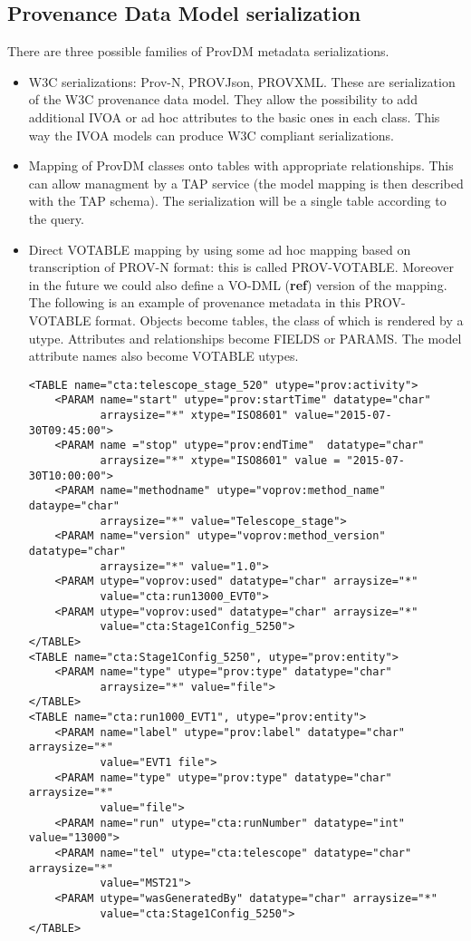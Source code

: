 \subsection{Provenance Data Model serialization}
There are three possible families of ProvDM metadata serializations.
\begin{itemize}
 \item W3C serializations: Prov-N, PROV\-Json, PROV\-XML. These are serialization of the W3C provenance data model. They allow the possibility to add additional IVOA or ad hoc attributes to the basic ones in each class. This way the IVOA models can produce W3C compliant serializations.
 \item Mapping of ProvDM classes onto tables with appropriate relationships. This can allow managment by a TAP service (the model mapping is then described with the TAP schema). The serialization will be a single table according to the query.

 \item Direct VOTABLE mapping by using some ad hoc mapping based on transcription of PROV-N format: this is called PROV-VOTABLE. Moreover in the future we could also define a VO-DML (\textbf{ref}) version of the mapping.
The following is an example of provenance metadata in this PROV-VOTABLE format. Objects become tables, the class of which is rendered by a utype. Attributes and relationships become FIELDS or PARAMS. The model attribute names also become VOTABLE utypes.  
\begin{verbatim}
<TABLE name="cta:telescope_stage_520" utype="prov:activity">
    <PARAM name="start" utype="prov:startTime" datatype="char" 
           arraysize="*" xtype="ISO8601" value="2015-07-30T09:45:00">
    <PARAM name ="stop" utype="prov:endTime"  datatype="char" 
           arraysize="*" xtype="ISO8601" value = "2015-07-30T10:00:00">
    <PARAM name="methodname" utype="voprov:method_name" dataype="char" 
           arraysize="*" value="Telescope_stage">
    <PARAM name="version" utype="voprov:method_version" datatype="char" 
           arraysize="*" value="1.0">    
    <PARAM utype="voprov:used" datatype="char" arraysize="*" 
           value="cta:run13000_EVT0">
    <PARAM utype="voprov:used" datatype="char" arraysize="*" 
           value="cta:Stage1Config_5250">
</TABLE>
<TABLE name="cta:Stage1Config_5250", utype="prov:entity">
    <PARAM name="type" utype="prov:type" datatype="char" 
           arraysize="*" value="file">   
</TABLE>
<TABLE name="cta:run1000_EVT1", utype="prov:entity">
    <PARAM name="label" utype="prov:label" datatype="char" arraysize="*" 
           value="EVT1 file">
    <PARAM name="type" utype="prov:type" datatype="char" arraysize="*" 
           value="file">
    <PARAM name="run" utype="cta:runNumber" datatype="int"  value="13000">
    <PARAM name="tel" utype="cta:telescope" datatype="char" arraysize="*" 
           value="MST21">
    <PARAM utype="wasGeneratedBy" datatype="char" arraysize="*" 
           value="cta:Stage1Config_5250">
</TABLE>
\end{verbatim}
  
  
\end{itemize}
